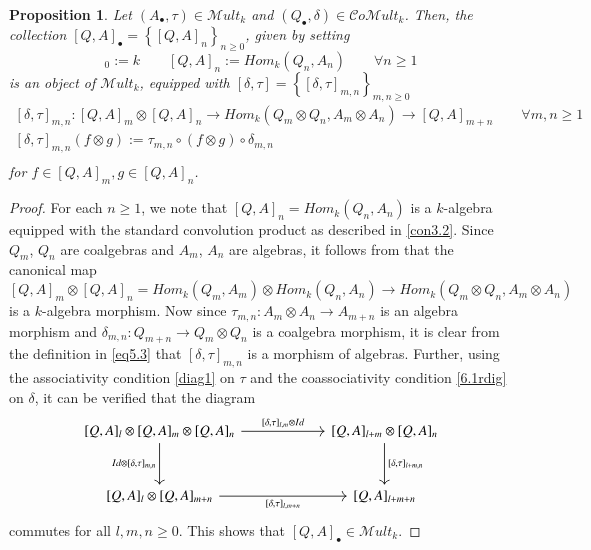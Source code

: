 \documentclass[10pt, colorlinks]{article}
\numberwithin{equation}{section} \DeclareMathSizes{2}{10}{12}{13}
\newtheorem{thm}{Proposition}[section]
\begin{document}
     \begin{thm}\label{prop5.2}
        Let $(A_\bullet,\tau)\in \mathscr Mult_k$ and $(Q_\bullet,\delta)\in \mathcal Co\mathscr Mult_k$. Then, the collection $ [Q, A]_\bullet=\left\{[Q, A]_n\right\}_{n\geq 0}$, given by setting 
        \begin{equation*}
            [Q, A]_0:=k\qquad [Q, A]_n:=Hom_k(Q_n,A_n)\qquad \forall n\geq1
        \end{equation*} 
        is an object of $\mathscr Mult_k$, equipped with $[\delta,\tau]=\left\{[\delta,\tau]_{m,n}\right\}_{m,n\geq 0}$ 
        \begin{equation}\label{eq5.3}
\begin{array}{c}
            [\delta,\tau]_{m,n}:  [Q, A]_m\otimes  [Q, A]_n\longrightarrow  Hom_k(Q_m\otimes Q_n,A_m\otimes A_n)\longrightarrow  [Q, A]_{m+n}\qquad 
\forall m,n\geq 1
\\
\mbox{$[\delta,\tau]_{m,n}(f\otimes g):=\tau_{m,n}\circ (f\otimes g)\circ \delta_{m,n}$}\\
\end{array}
        \end{equation}
        for $f\in  [Q, A]_m,g\in  [Q, A]_n$.
    \end{thm}



    
    \begin{proof}
     For each $n\geq 1$, we note that $ [Q, A]_n=Hom_k(Q_n,A_n)$ is a $k$-algebra equipped with the standard convolution product as described in \eqref{con3.2}. Since $Q_m$, $Q_n$ are coalgebras and $A_m$, $A_n$ are algebras, it follows from  \cite[Lemma 3.7.5]{AJ} that the canonical map
\begin{equation}\label{6.4rt}
 [Q, A]_m\otimes  [Q, A]_n=Hom_k(Q_m,A_m)\otimes Hom_k(Q_n,A_n) \longrightarrow  Hom_k(Q_m\otimes Q_n,A_m\otimes A_n)
\end{equation} is a $k$-algebra morphism. Now  since $\tau_{m,n}:A_m\otimes A_n\longrightarrow A_{m+n}$ is an algebra morphism and $\delta_{m,n}:Q_{m+n}\longrightarrow Q_m\otimes Q_n$ is a coalgebra morphism, it is clear from the definition in \eqref{eq5.3}  that $[\delta,\tau]_{m,n}$ is a morphism of algebras. Further, using the associativity condition \eqref{diag1} on $\tau$ and the coassociativity condition \eqref{6.1rdig} on $\delta$, it can be verified that the diagram 
        \begin{equation*}
\begin{tikzcd}[row sep=3em,  column sep=6em]
 [Q,A]_l\otimes  [Q,A]_m\otimes  [Q,A]_n
\arrow[r, "{[\delta,\tau]_{l,m}\otimes Id }"]
\arrow[d, "{Id\otimes [\delta,\tau]_{m,n}}"']
&  {[Q,A]_{l+m} \otimes  [Q,A]_n} \arrow[d, "{[\delta,\tau]_{l+m,n}}"] \\
 {[Q,A]_l \otimes  [Q,A]_{m+n}}
\arrow[r, " {[\delta,\tau]_{l,m+n}}"']
&  {[Q,A]_{l+m+n}}
\end{tikzcd}
\end{equation*} 
commutes for all $l,m,n\geq 0$. This shows that $ [Q, A]_\bullet\in \mathscr Mult_k$.
\end{proof}
\end{document}
